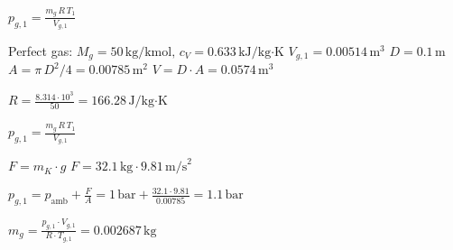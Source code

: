 \( p_{g,1} = \frac{m_g \, R \, T_1}{V_{g,1}} \)  

Perfect gas: \( M_g = 50 \, \text{kg/kmol}, \, c_V = 0.633 \, \text{kJ/kg·K} \)  
\( V_{g,1} = 0.00514 \, \text{m}^3 \)  
\( D = 0.1 \, \text{m} \)  
\( A = \pi \, D^2 / 4 = 0.00785 \, \text{m}^2 \)  
\( V = D \cdot A = 0.0574 \, \text{m}^3 \)  

\( R = \frac{8.314 \cdot 10^3}{50} = 166.28 \, \text{J/kg·K} \)  

\( p_{g,1} = \frac{m_g \, R \, T_1}{V_{g,1}} \)  

\( F = m_K \cdot g \)  
\( F = 32.1 \, \text{kg} \cdot 9.81 \, \text{m/s}^2 \)  

\( p_{g,1} = p_{\text{amb}} + \frac{F}{A} = 1 \, \text{bar} + \frac{32.1 \cdot 9.81}{0.00785} = 1.1 \, \text{bar} \)  

\( m_g = \frac{p_{g,1} \cdot V_{g,1}}{R \cdot T_{g,1}} = 0.002687 \, \text{kg} \)
